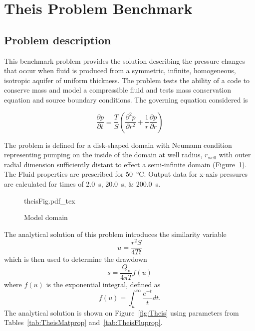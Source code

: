 \section{Theis Problem Benchmark}
\subsection{Problem description}

This benchmark problem provides the solution describing the pressure changes that occur when fluid is produced from a symmetric, infinite, homogeneous, isotropic aquifer of uniform thickness.  The problem tests the ability of a code to conserve mass and model a compressible fluid and tests mass conservation equation and source boundary conditions. The governing equation considered is

\begin{equation}
	\frac{\partial p}{\partial t} = \frac{T}{S}\left(\frac{\partial^2 p}{\partial r^2}+\frac{1}{r}\frac{\partial p}{\partial r} \right)
	\label{eq:Theis}
\end{equation}

The problem is defined for a disk-shaped domain with Neumann condition representing pumping on the inside of the domain at well radius, $r_{\text{well}}$ with outer radial dimension sufficiently distant to effect a semi-infinite domain (Figure~\ref{fig:theisFig}). The Fluid properties are prescribed for \SI[scientific-notation=false,round-precision=2]{50}{\degreeCelsius}. Output data for x-axis pressures are calculated for times of \SIlist[scientific-notation=false, round-precision=2]{2.0; 20.0; 200.0}{\second}. %

\begin{figure}[h]
	\centering
	{theisFig.pdf_tex}
	\caption{Model domain}
	\label{fig:theisFig}
\end{figure}

The analytical solution of this problem introduces the similarity variable
\begin{equation}
	u=\frac{r^2 S}{4Tt}
	\label{eq:simVar}
\end{equation}
which is then used to determine the drawdown
\begin{equation}
	s=\frac{Q_v}{4\pi T}f(u)
	\label{eq:drawdown}
\end{equation}
where $f(u)$ is the exponential integral, defined as
\begin{equation}
	f(u)=\int_u^\infty \frac{e^{-t}}{t}dt.
	\label{eq:expInt}
\end{equation}
The analytical solution is shown on Figure~\ref{fig:Theis} using parameters from Tables~\ref{tab:TheisMatprop} and~\ref{tab:TheisFluprop}.


